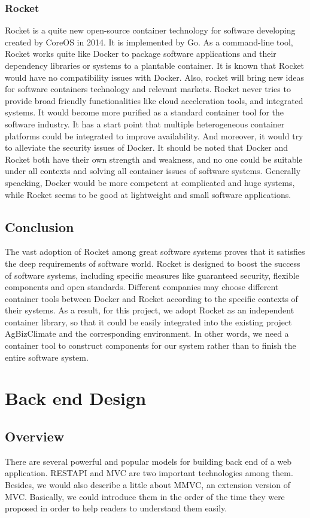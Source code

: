 \documentclass[letterpaper,10pt]{article}
\begin{document}
		\subsubsection{Rocket}
    Rocket is a quite new open-source container technology for software developing created by CoreOS in 2014. It is implemented by Go. As a command-line tool, Rocket works quite like Docker to package software applications and their dependency libraries or systems to a plantable container. It is known that Rocket would have no compatibility issues with Docker. Also, rocket will bring new ideas for software containers technology and relevant markets. Rocket never tries to provide broad friendly functionalities like cloud acceleration tools, and integrated systems. It would become more purified as a standard container tool for the software industry. It has a start point that multiple heterogeneous container platforms could be integrated to improve availability. And moreover, it would try to alleviate the security issues of Docker. It should be noted that Docker and Rocket both have their own strength and weakness, and no one could be suitable under all contexts and solving all container issues of software systems. Generally speacking, Docker would be more competent at complicated and huge systems, while Rocket seems to be good at lightweight and small software applications.

	\subsection{Conclusion}
  The vast adoption of Rocket among great software systems proves that it satisfies the deep requirements of software world. Rocket is designed to boost the success of software systems, including specific measures like guaranteed security, flexible components and open standards. Different companies may choose different container tools between Docker and Rocket according to the specific contexts of their systems.
  As a result, for this project, we adopt Rocket as an independent container library, so that it could be easily integrated into the existing project AgBizClimate and the corresponding environment. In other words, we need a container tool to construct components for our system rather than to finish the entire software system.


\section{Back end Design}
	\subsection{Overview}
        There are several powerful and popular models for building back end of a web application. RESTAPI and MVC are two important technologies among them. Besides, we would also describe a little about MMVC, an extension version of MVC. Basically, we could introduce them in the order of the time they were proposed in order to help readers to understand them easily.
\end{document}
